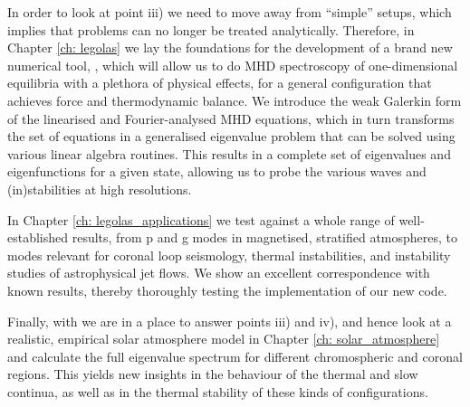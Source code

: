 In order to look at point iii) we need to move away from ``simple'' setups, which implies that problems can no longer be treated analytically. Therefore, in Chapter \ref{ch: legolas} we lay the foundations for the development of a brand new numerical tool, {\legolas}, which will allow us to do MHD spectroscopy of one-dimensional equilibria with a plethora of physical effects, for a general configuration that achieves force and thermodynamic balance. We introduce the weak Galerkin form of the linearised and Fourier-analysed MHD equations, which in turn transforms the set of equations in a generalised eigenvalue problem that can be solved using various linear algebra routines. This results in a complete set of eigenvalues and eigenfunctions for a given state, allowing us to probe the various waves and (in)stabilities at high resolutions.

In Chapter \ref{ch: legolas_applications} we test {\legolas} against a whole range of well-established results, from p and g modes in magnetised, stratified atmospheres, to modes relevant for coronal loop seismology, thermal instabilities, and instability studies of astrophysical jet flows. We show an excellent correspondence with known results, thereby thoroughly testing the implementation of our new code.

Finally, with {\legolas} we are in a place to answer points iii) and iv), and hence look at a realistic, empirical solar atmosphere model in Chapter \ref{ch: solar_atmosphere} and calculate the full eigenvalue spectrum for different chromospheric and coronal regions. This yields new insights in the behaviour of the thermal and slow continua, as well as in the thermal stability of these kinds of configurations.




\cleardoublepage
